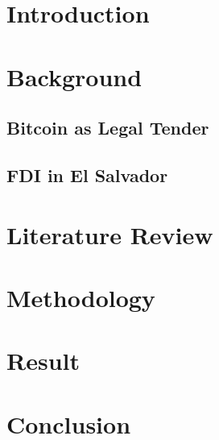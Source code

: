 \documentclass{ntuthesis}
\def\withwatermark{1}
\begin{document}
\frontmatter

\makecover

\ifdefined\excludefirstpage

  \def\withwatermark{1}
  \ifdefined\withwatermark
    \newsavebox\mybox
    \savebox{}
    \newwatermark*[allpages,xpos=6.1725cm,ypos=10.5225cm,scale=0.5]{\usebox\mybox}
  \fi

  \ifdefined\withdoi
    \insertdoi
  \fi
\fi


% 
% 


\mainmatter


\chapter{Introduction}
  \label{ch:intro}
\chapter{Background} \label{ch:background}
  \section{Bitcoin as Legal Tender}\label{sec:bit-el}
  
  \section{FDI in El Salvador}\label{sec:fdi-el}
  
  
\chapter{Literature Review} \label{ch:lit}
\chapter{Methodology} \label{ch:method}

\chapter{Result}  \label{ch:result}
\chapter{Conclusion} \label{ch:conclusion}
\end{document}
